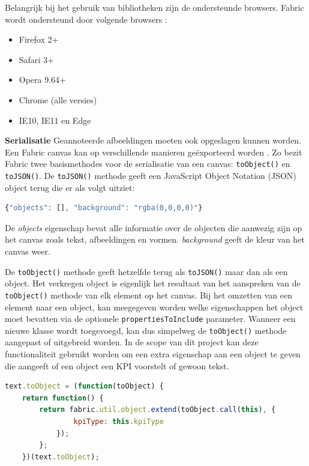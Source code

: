 Belangrijk bij het gebruik van bibliotheken zijn de ondersteunde browsers. Fabric wordt ondersteund door volgende browsers \cite{Fabricsupportedbrowsers}: 
\begin{itemize}
	\item Firefox 2+
	\item Safari 3+ 
	\item Opera 9.64+
	\item Chrome (alle versies)
	\item IE10, IE11 en Edge
\end{itemize}

\textbf{Serialisatie} \break
Geannoteerde afbeeldingen moeten ook opgeslagen kunnen worden. Een Fabric canvas kan op verschillende manieren ge\"{e}xporteerd worden \cite{FabricJSIntro3Serialization}. Zo bezit Fabric twee basismethodes voor de serialisatie van een canvas: \texttt{toObject()} en \texttt{toJSON()}. De \texttt{toJSON()} methode geeft een JavaScript Object Notation (JSON) object terug die er als volgt uitziet:

\begin{lstlisting}[language=javascript]
 {"objects": [], "background": "rgba(0,0,0,0)"}
\end{lstlisting} 

De \textit{objects} eigenschap bevat alle informatie over de objecten die aanwezig zijn op het canvas zoals tekst, afbeeldingen en vormen. \textit{background} geeft de kleur van het canvas weer. 


De \texttt{toObject()} methode geeft hetzelfde terug als \texttt{toJSON()} maar dan als een object. Het verkregen object is eigenlijk het resultaat van het aanspreken van de \texttt{toObject()} methode van elk element op het canvas. Bij het omzetten van een element naar een object, kan meegegeven worden welke eigenschappen het object moet bevatten via de optionele \texttt{propertiesToInclude} parameter. Wanneer een nieuwe klasse wordt toegevoegd, kan dus simpelweg de \texttt{toObject()} methode aangepast of uitgebreid worden. In de scope van dit project kan deze functionaliteit gebruikt worden om een extra eigenschap aan een object te geven die aangeeft of een object een KPI voorstelt of gewoon tekst.  

\begin{lstlisting}[language=javascript]
	text.toObject = (function(toObject) {   
	return function() {     
		return fabric.util.object.extend(toObject.call(this), {       
				kpiType: this.kpiType     
			});   
		}; 
	})(text.toObject);
\end{lstlisting}

